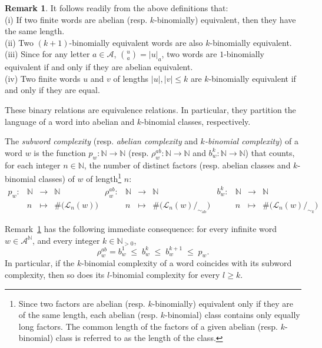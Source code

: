\documentclass{template_arxiv}
\theoremstyle{definition}
\newtheorem{remark}[lemma]{Remark}
\newcommand{\N}{\mathbb{N}}
\newcommand{\A}{\mathcal{A}}
\newcommand{\lan}{\mathcal{L}}
\newcommand{\abeq}{\sim_{\text{ab}}}
\begin{document}
\begin{remark}\label{rk:k-bin}
It follows readily from the above definitions that:\\
(i) If two finite words are abelian (resp. $k$-binomially) equivalent, then they have the same length.\\
(ii) Two $(k+1)$-binomially equivalent words are also $k$-binomially equivalent.\\
(iii) Since for any letter $a\in\A$, $\binom{u}{a}=|u|_a$, two words are $1$-binomially equivalent if and only if they are abelian equivalent.\\
(iv) Two finite words $u$ and $v$ of lengths $|u|,|v|\leq k$ are $k$-binomially equivalent if and only if they are equal.
\end{remark}

These binary relations are equivalence relations. In particular, they partition the language of a word into abelian and $k$-binomial classes, respectively.

The \emph{subword complexity} (resp. \emph{abelian complexity} and \emph{$k$-binomial complexity}) of a word $w$ is the function $p_w:\N\to\N$ (resp. $\rho_w^{ab}:\N\to\N$ and $b_w^k:\N\to\N$) that counts, for each integer $n\in\N$, the number of distinct factors (resp. abelian classes and $k$-binomial classes) of $w$ of length\footnote{
Since two factors are abelian (resp. $k$-binomially) equivalent only if they are of the same length, each abelian (resp. $k$-binomial) class contains only equally long factors. The common length of the factors of a given abelian (resp. $k$-binomial) class is referred to as the length of the class. 
} $n$:
\[
    \begin{array}{rcclrcclrccl}
        p_w:&\N&\rightarrow&\N & \rho_w^{ab}:&\N&\rightarrow&\N & b_w^k:&\N&\rightarrow&\N\\
        & n&\mapsto&\#\big(\lan_n(w)\big) && n&\mapsto&\#\big(\lan_n(w)/_{\abeq}\big) && n&\mapsto&\#\big(\lan_n(w)/_{\sim_k}\big)
    \end{array}
\]

Remark~\ref{rk:k-bin} has the following immediate consequence: for every infinite word $w\in\A^\N$, and every integer $k\in\N_{>0}$,
\begin{equation}\label{eq:scale}
    \rho_w^{ab}=b_w^1 \;\leq\; b_w^k \;\leq\; b_w^{k+1} \;\leq\; p_w.
\end{equation}
In particular, if the $k$-binomial complexity of a word coincides with its subword complexity, then so does its $l$-binomial complexity for every $l\geq k$.
\end{document}
